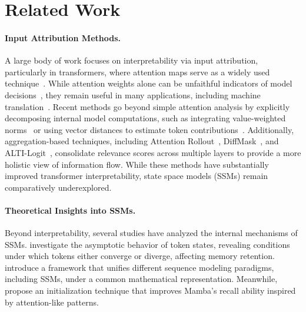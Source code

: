 \section{Related Work}
\paragraph{Input Attribution Methods.}
A large body of work focuses on interpretability via input attribution, particularly in transformers, where attention maps serve as a widely used technique~\citep{fantozzi2024explainability}. While attention weights alone can be unfaithful indicators of model decisions~\citep{jain-wallace-2019-attention,bastings-filippova-2020-elephant}, they remain useful in many applications, including machine translation~\citep{wiegreffe-pinter-2019-attention,treviso-martins-2020-explanation}. 
Recent methods go beyond simple attention analysis by explicitly decomposing internal model computations, such as integrating value-weighted norms~\citep{kobayashi-etal-2020-attention} or using vector distances to estimate token contributions~\citep{ferrando-etal-2022-measuring}. 
Additionally, aggregation-based techniques, including Attention Rollout~\citep{abnar-zuidema-2020-quantifying}, DiffMask~\citep{de-cao-etal-2020-decisions}, and ALTI-Logit~\citep{ferrando-etal-2023-explaining}, consolidate relevance scores across multiple layers to provide a more holistic view of information flow.
While these methods have substantially improved transformer interpretability, state space models (SSMs) remain comparatively underexplored.

\paragraph{Theoretical Insights into SSMs.}
Beyond interpretability, several studies have analyzed the internal mechanisms of SSMs. 
\citet{vo2025demystifying} investigate the asymptotic behavior of token states, revealing conditions under which tokens either converge or diverge, affecting memory retention.
\citet{sieber2024understanding} introduce a framework that unifies different sequence modeling paradigms, including SSMs, under a common mathematical representation.
Meanwhile, \citet{trockman2024mimeticinitializationhelpsstate} propose an initialization technique that improves Mamba's recall ability inspired by attention-like patterns.


